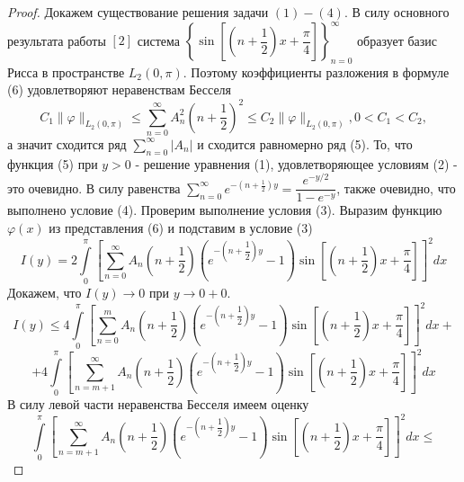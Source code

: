 \documentclass[a4paper, 11pt]{article}
\begin{document}
\begin{proof}
   
Докажем существование решения задачи $(1) - (4)$. В силу основного результата работы $[2]$ система  $\left\{\sin{\left[\left(n + \dfrac12\right)x + \dfrac\pi4\right]}\right\}_{n=0}^{\infty}$ образует базис Рисса в пространстве $L_2(0, \pi)$. Поэтому коэффициенты разложения в формуле (6) удовлетворяют неравенствам Бесселя
\begin{equation*}
	C_1 \|\varphi \|_{L_2(0,\pi)} \leq \sum\limits_{n=0}^{\infty} A_n^2 \left(n + \dfrac12\right)^2 \leq C_2 \|\varphi \|_{L_2(0,\pi)} , 0 < C_1 < C_2, 
\end{equation*}
а значит сходится ряд $\sum\limits_{n=0}^{\infty} |A_n|$ и сходится равномерно ряд (5). То, что функция (5) при $y > 0$ - решение уравнения (1), удовлетворяющее условиям (2) - это очевидно. В силу равенства $\sum\limits_{n=0}^{\infty} e^{-\left(n + \frac12\right)y} = \dfrac{e^{-y/2}}{1 - e^{-y}}$, также очевидно, что выполнено условие (4). Проверим выполнение условия (3).\newline
Выразим функцию $\varphi(x)$ из представления (6) и подставим в условие (3)
\begin{equation*}
	I(y) =  2 \int\limits_0^\pi \left[	\sum\limits_{n=0}^{\infty} A_n\left(n+\dfrac12\right) \left( e^{-\left(n+\dfrac12\right)y} - 1\right) \sin{\left[\left(n+\dfrac12\right) x  + \dfrac\pi4\right]} \right]^2 dx
\end{equation*}
Докажем, что $I(y) \to 0$ при $y \to 0+0$. 
\begin{equation*}
	I(y) \leq 4\int\limits_0^\pi \left[	\sum\limits_{n=0}^{m} A_n\left(n+\dfrac12\right) \left( e^{-\left(n+\dfrac12\right)y} - 1\right) \sin{\left[\left(n+\dfrac12\right) x  + \dfrac\pi4\right]} \right]^2 dx + 
\end{equation*}
\begin{equation*}
	+ 4\int\limits_0^\pi \left[	\sum\limits_{n=m+1}^{\infty} A_n\left(n+\dfrac12\right) \left( e^{-\left(n+\dfrac12\right)y} - 1\right) \sin{\left[\left(n+\dfrac12\right) x  + \dfrac\pi4\right]} \right]^2 dx
\end{equation*}
В силу левой части неравенства Бесселя имеем оценку
\begin{equation*}
	\int\limits_0^\pi \left[	\sum\limits_{n=m+1}^{\infty} A_n\left(n+\dfrac12\right) \left( e^{-\left(n+\dfrac12\right)y} - 1\right) \sin{\left[\left(n+\dfrac12\right) x  + \dfrac\pi4\right]} \right]^2 dx \leq 
\end{equation*}
\begin{equation*}

\end{equation*}
\end{proof}
\end{document}
